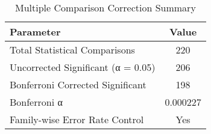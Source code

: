\begin{table}[htbp]
\centering
\caption{Multiple Comparison Correction Summary}
\label{tab:multiple-corrections}
\begin{tabular}{lc}
\toprule
Parameter & Value \\
\midrule
Total Statistical Comparisons & 220 \\
Uncorrected Significant (α = 0.05) & 206 \\
Bonferroni Corrected Significant & 198 \\
Bonferroni α & 0.000227 \\
Family-wise Error Rate Control & Yes \\
\bottomrule
\end{tabular}
\end{table}
